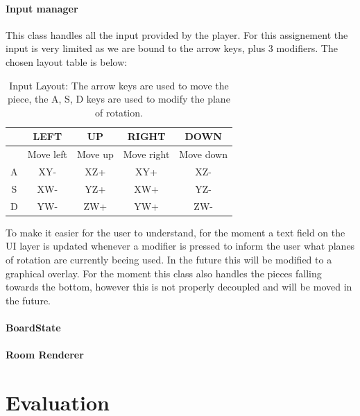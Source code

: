 \documentclass{article}
\begin{document}
\paragraph{Input manager}
This class handles all the input provided by the player. For this assignement the input is very limited as we are bound to the arrow keys, plus 3 modifiers. The chosen layout table is below:
\begin{table}[H]
    \centering
    \begin{tabular}{|c|c|c|c|c|}
    \hline
     & LEFT & UP & RIGHT& DOWN\\
    \hline
     & Move left & Move up & Move right & Move down\\
    A & XY- & XZ+ & XY+ & XZ-\\
    S & XW- & YZ+ & XW+ & YZ-\\
    D & YW- & ZW+ & YW+ & ZW-\\
    \hline
    \end{tabular}
    \caption{Input Layout: The arrow keys are used to move the piece, the A, S, D keys are used to modify the plane of rotation.}
    \label{tab:input}
\end{table}
To make it easier for the user to understand, for the moment a text field on the UI layer is updated whenever a modifier is pressed to inform the user what planes of rotation are currently beeing used. In the future this will be modified to a graphical overlay.
For the moment this class also handles the pieces falling towards the bottom, however this is not properly decoupled and will be moved in the future.


\paragraph{BoardState}

\paragraph{Room Renderer}

\section{Evaluation}



\end{document}
